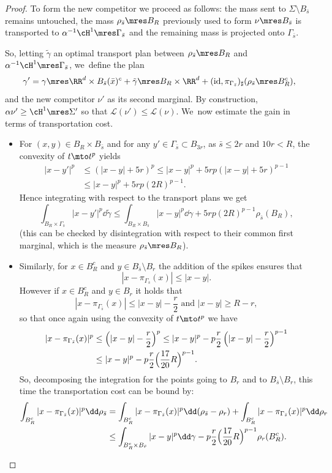 \begin{proof}
To form the new competitor we proceed as follows: the mass sent to $\Sigma\setminus B_{\bar s}$ remains untouched, the mass $\rho_{\bar s}\mres B_R$ previously used to form $\nu\mres B_{\bar s}$ is transported to $\alpha^{-1}\cH^1\mres \Gamma_{\bar s}$ and the remaining mass is projected onto $\Gamma_{\bar s}$.

So, letting $\tilde \gamma$ an optimal transport plan between $\rho_{\bar s}\mres B_R$ and $\alpha^{-1}\cH^1\mres \Gamma_{\bar s}$, we~define the plan
\[
\gamma' =
\gamma\mres \RR^d\times B_{\bar s}(\bar x)^c
+
\tilde \gamma\mres B_R\times\RR^d
+
(\text{id}, \pi_{\Gamma_{\bar s}})_\sharp(\rho_{\bar s}\mres B_R^c),
\]
and the new competitor $\nu'$ as its second marginal. By construction, $\alpha\nu' \ge \cH^1\mres \Sigma'$ so that $\mathcal{L}(\nu') \le \mathcal{L}(\nu)$. We~now estimate the gain in terms of transportation cost.
\begin{itemize}
\item For $(x,y)\in B_R\times B_{\bar s}$ and for any $y' \in \Gamma_{\bar s}\subset B_{3r}$, as $\bar s\le 2r$ and $10r < R$, the convexity of $t \mto t^p$ yields
\begin{align*}
|x - y'|^p
&\le
\left(|x - y| + 5r\right)^p
\le
|x - y|^p
+
5rp
\left(|x - y|+5r\right)^{p-1} \\
&\le
|x - y|^p
+
5rp {{\left(2R\right)^{p-1}}}.
\end{align*}
Hence integrating with respect to the transport plans we get
\[
\int_{B_R\times\Gamma_{\bar s}}|x - y'|^p \dd \tilde \gamma
\le
\int_{B_R\times B_{\bar s}}|x - y|^p \dd \gamma
+
5rp
\left({2R}\right)^{p-1}\rho_{\bar s}(B_R),
\]
(this can be checked by disintegration with respect to their common first marginal, which is the measure $\rho_{\bar s}\mres B_R$).
\item
Similarly, for $x \in B_R^c$ and $y \in B_{\bar s}\setminus B_r$ the addition of the spikes ensures that
\[
|x - \pi_{\Gamma_{\bar s}}(x)| \le |x - y|.
\]
However if $x \in B_R^c$ and $y \in B_r$ it holds that
\[
|x - \pi_{\Gamma_{\bar s}}(x)| \le |x - y| - \frac{r}{2}
\text{ and }
|x - y| \ge R - r,
\]
so that once again using the convexity of $t\mto t^p$ we have
\begin{align*}
|x - \pi_{\Gamma_{\bar s}}(x)|^p
&\le
\left(|x - y| -\frac{r}{2}\right)^p
\le
|x - y|^p
-
p\frac{r}{2}
\left(|x - y|-\frac{r}{2}\right)^{p-1}\\
&\le
|x - y|^p
-
p\frac{r}{2}
\Bigl(\frac{17}{20}R\Bigr)^{p-1}.
\end{align*}
So, decomposing the integration for the points going to $B_r$ and to $B_{\bar s}\setminus B_r$, this time the transportation cost can be bound by:
\begin{align*}
\int_{B_R^c}
|x - \pi_{\Gamma_{\bar s}}(x)|^p \dd \rho_{\bar s}
&=
\int_{B_R^c}
|x - \pi_{\Gamma_{\bar s}}(x)|^p \dd (\rho_{\bar s} -\rho_{r})
+
\int_{B_R^c}
|x - \pi_{\Gamma_{\bar s}}(x)|^p \dd \rho_{r}\\
&\le
\int_{B_R^c\times B_{\bar r}}|x - y|^p \dd \gamma
-
p\frac{r}{2}
\Bigl(\frac{17}{20}R\Bigr)^{p-1}\rho_r(B_R^c).
\end{align*}
\end{itemize}


\end{proof}
